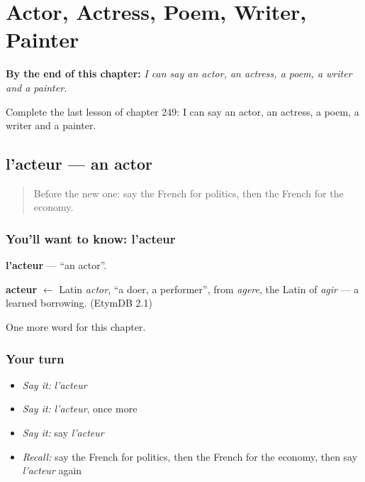 
\chapter{Actor, Actress, Poem, Writer, Painter}
\label{ch:fr-actor-actress-poem-writer-painter}

\begin{chapteropening}
\textbf{By the end of this chapter:} \emph{I can say an actor, an actress, a poem, a writer and a painter.}

Complete the last lesson of chapter 249: I can say an actor, an actress, a poem, a writer and a painter.
\end{chapteropening}

\section[l'acteur]{l'acteur — an actor}

\label{lesson:FR-C249-acteur}



\begin{quote}
Before the new one: say the French for politics, then the French for the economy.
\end{quote}

\subsection*{You'll want to know: l'acteur}
\textbf{l'acteur} — \textquotedblleft{}an actor\textquotedblright{}.

\begin{cousinweb}
\textbf{acteur} $\leftarrow$ Latin \emph{actor}, \textquotedblleft{}a doer, a performer\textquotedblright{}, from \emph{agere}, the Latin of \emph{agir} — a learned borrowing. (EtymDB 2.1)
\end{cousinweb}

\begin{grammarlens}[title={What you've built}]
One more word for this chapter.
\end{grammarlens}

\subsection*{Your turn}
\begin{itemize}
\raggedright
  \item \emph{Say it:} \emph{l'acteur}
  \item \emph{Say it:} \emph{l'acteur}, once more
  \item \emph{Say it:} say \emph{l'acteur}
  \item \emph{Recall:} say the French for politics, then the French for the economy, then say \emph{l'acteur} again
\end{itemize}

